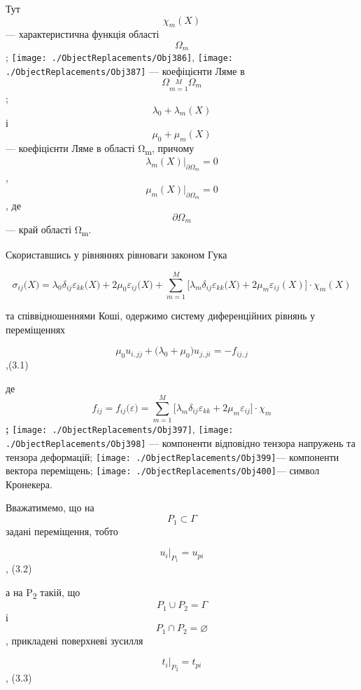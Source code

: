 Тут \[{\chi_{m}(X)}{}\] --- характеристична функція області
\[\Omega_{m}{}\];
\texttt{[image: ./ObjectReplacements/Obj386]},
\texttt{[image: ./ObjectReplacements/Obj387]}
--- коефіцієнти Ляме в
\[{\Omega\underset{m = 1}{\overset{M}{}}\Omega_{m}}{}\];
\[{{\lambda_{0} + \lambda_{m}}(X)}{}\] і \[{{\mu_{0} + \mu_{m}}(X)}{}\]
--- коефіцієнти Ляме в області Ω\textsubscript{m}, причому
\[{\lambda_{m}(X){|_{\partial\Omega_{m}} = 0}}{}\],
\[{\mu_{m}(X){|_{\partial\Omega_{m}} = 0}}{}\], де
\[{\partial\Omega_{m}}{}\] --- край області Ω\textsubscript{m}.

Скориставшись у рівняннях рівноваги законом Гука

\[{\sigma_{\mathit{\text{ij}}}(X{) = \lambda_{0}}\delta_{\mathit{\text{ij}}}\varepsilon_{\mathit{\text{kk}}}(X{) + 2}\mu_{0}\varepsilon_{\mathit{\text{ij}}}(X{) + {{\sum\limits_{m = 1}^{M}{\lbrack\lambda_{m}\delta_{\mathit{\text{ij}}}\varepsilon_{\mathit{\text{kk}}}(X{) + 2}\mu_{m}\varepsilon_{\mathit{\text{ij}}}(X)\rbrack}} \cdot \chi_{m}}}(X)}{}\]

та співвідношеннями Коші, одержимо систему диференційних рівнянь у
переміщеннях

\[{\mu_{0}{u_{i,\mathit{\text{jj}}} + (}{\lambda_{0} + \mu_{0}}){u_{j,\mathit{\text{ji}}} = {- f_{\mathit{\text{ij}},j}}}}{}\],(3.1)

де
\[{{f_{\mathit{\text{ij}}} = f_{\mathit{\text{ij}}}}(\varepsilon{) = {\sum\limits_{m = 1}^{M}{\lbrack\lambda_{m}\delta_{\mathit{\text{ij}}}{\varepsilon_{\mathit{\text{kk}}} + 2}\mu_{m}\varepsilon_{\mathit{\text{ij}}}{\rbrack \cdot \chi_{m}}}}}}{}\]\textbf{;
}\texttt{[image: ./ObjectReplacements/Obj397]},
\texttt{[image: ./ObjectReplacements/Obj398]}
--- компоненти відповідно тензора напружень та тензора деформацій;
\texttt{[image: ./ObjectReplacements/Obj399]}---
компоненти вектора переміщень;
\texttt{[image: ./ObjectReplacements/Obj400]}---
символ Кронекера.

Вважатимемо, що на \[{P_{1}\subset\Gamma}{}\] задані переміщення, тобто

\[{u_{i}{|_{P_{1}} = u_{\mathit{\text{pi}}}}}{}\], (3.2)

а на P\textsubscript{2 }такій, що \[{{P_{1} \cup P_{2}} = \Gamma}{}\] і
\[{{P_{1} \cap P_{2}} = \varnothing}{}\], прикладені поверхневі зусилля

\[{t_{i}{|_{P_{2}} = t_{\mathit{\text{pi}}}}}{}\], (3.3)


